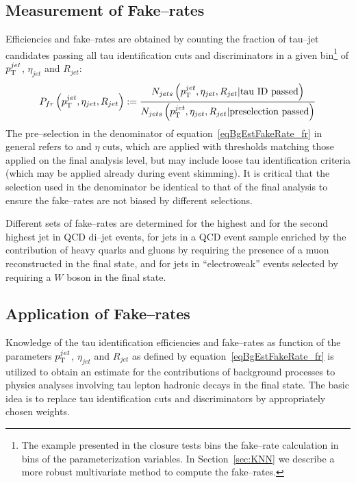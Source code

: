 \subsection{Measurement of Fake--rates}
%
Efficiencies and fake--rates are obtained by counting the fraction of tau--jet
candidates passing all tau identification cuts and discriminators in a given
bin\footnote{The example presented in the closure tests bins the fake--rate
calculation in bins of the parameterization variables.  In Section~\ref{sec:KNN}
we describe a more robust multivariate method to compute the fake--rates.} of
$p_{\mathrm{T}}^{jet}$, $\eta_{jet}$ and $R_{jet}$:
\begin{equation}
P_{fr} \left( p_{\mathrm{T}}^{jet}, \eta_{jet}, R_{jet} \right) := 
  \frac{N_{jets} \left( p_{\mathrm{T}}^{jet}, \eta_{jet}, R_{jet} \vert \mbox{tau ID passed} \right)}
       {N_{jets} \left( p_{\mathrm{T}}^{jet}, \eta_{jet}, R_{jet} \vert \mbox{preselection passed} \right)}
\label{eqBgEstFakeRate_fr}
\end{equation}
The pre--selection in the denominator of equation~\ref{eqBgEstFakeRate_fr} in
general refers to \pt and $\eta$ cuts, which are applied with thresholds
matching those applied on the final analysis level, but may include
loose tau identification criteria (which may be applied \eg already during event
skimming).  It is critical that the selection used in the denominator be
identical to that of the final analysis to ensure the fake--rates are not biased
by different selections.

Different sets of fake--rates are determined for the highest \pt and for the
second highest \pt jet in QCD di--jet events, for jets in a QCD event sample
enriched by the contribution of heavy quarks and gluons by requiring the
presence of a muon reconstructed in the final state, and for jets in
``electroweak'' events selected by requiring a $W$ boson in the final state.

\subsection{Application of Fake--rates}
\label{sec:FakeRateApplication}
%
Knowledge of the tau identification efficiencies and fake--rates as function of
the parameters $p_{\mathrm{T}}^{jet}$, $\eta_{jet}$ and $R_{jet}$ as defined by
equation~\ref{eqBgEstFakeRate_fr} is utilized to obtain an estimate for the
contributions of background processes to physics analyses involving tau lepton
hadronic decays in the final state.  The basic idea is to replace tau
identification cuts and discriminators by appropriately chosen weights.


